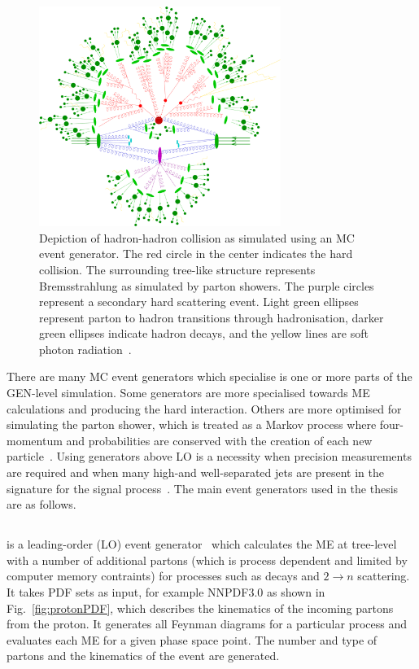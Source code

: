 \begin{figure}[ht!]
\begin{center}
    \includegraphics[width=0.7\textwidth]{images/eventGen.png}
    \caption{Depiction of hadron-hadron collision as simulated using an MC event generator. The red circle in the center indicates the hard collision. The surrounding tree-like structure represents Bremsstrahlung as simulated by parton showers. The purple circles represent a secondary hard scattering event. Light green ellipses represent parton to hadron transitions through hadronisation, darker green ellipses indicate hadron decays, and the yellow lines are soft photon radiation~\cite{Hoche:2014rga}.}
    \label{fig:MCGen}
\end{center}
\end{figure}

There are many MC event generators which specialise is one or more parts of the GEN-level simulation. Some generators are more specialised towards ME calculations and producing the hard interaction. Others are more optimised for simulating the parton shower, which is treated as a Markov process where four-momentum and probabilities are conserved with the creation of each new particle~\cite{Hoche:2014rga}.
Using generators above LO is a necessity when precision measurements are required and when many high-\pt and well-separated jets are present in the signature for the signal process~\cite{Degrande:2014sta}. The main event generators used in the thesis are as follows.

\subsection{\MADGRAPH}
\MADGRAPH is a leading-order (LO) event generator~\cite{Alwall2011} which calculates the ME at tree-level with a number of additional partons (which is process dependent and 	limited by computer memory contraints) for processes such as decays and $2\rightarrow n$ scattering. It takes PDF sets as input, for example NNPDF3.0 as shown in Fig.~\ref{fig:protonPDF}, which describes the kinematics of the incoming partons from the proton. It generates all Feynman diagrams for a particular process and evaluates each ME for a given phase space point. The number and type of partons and the kinematics of the event are generated.
